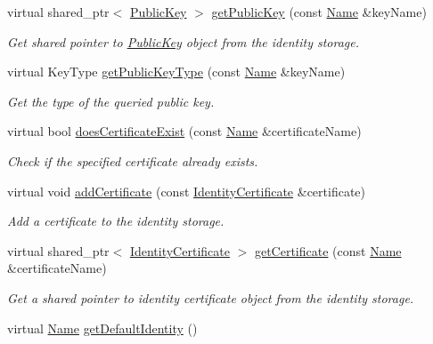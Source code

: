 \begin{DoxyCompactItemize}
virtual shared\+\_\+ptr$<$ \hyperlink{classndn_1_1PublicKey}{Public\+Key} $>$ \hyperlink{classndn_1_1security_1_1DummyPublicInfo_a78a048f1e6f2c9a71e446d6392f3caa7}{get\+Public\+Key} (const \hyperlink{classndn_1_1Name}{Name} \&key\+Name)
\begin{DoxyCompactList}\small\item\em Get shared pointer to \hyperlink{classndn_1_1PublicKey}{Public\+Key} object from the identity storage. \end{DoxyCompactList}\item 
virtual Key\+Type \hyperlink{classndn_1_1security_1_1DummyPublicInfo_a442a7677587ae4647321d05c0caba1b3}{get\+Public\+Key\+Type} (const \hyperlink{classndn_1_1Name}{Name} \&key\+Name)
\begin{DoxyCompactList}\small\item\em Get the type of the queried public key. \end{DoxyCompactList}\item 
virtual bool \hyperlink{classndn_1_1security_1_1DummyPublicInfo_a8a814b380ac6a455e1168f9f3d22f836}{does\+Certificate\+Exist} (const \hyperlink{classndn_1_1Name}{Name} \&certificate\+Name)
\begin{DoxyCompactList}\small\item\em Check if the specified certificate already exists. \end{DoxyCompactList}\item 
virtual void \hyperlink{classndn_1_1security_1_1DummyPublicInfo_a37920a411ee483dd633dc35b0a34d8f5}{add\+Certificate} (const \hyperlink{classndn_1_1IdentityCertificate}{Identity\+Certificate} \&certificate)
\begin{DoxyCompactList}\small\item\em Add a certificate to the identity storage. \end{DoxyCompactList}\item 
virtual shared\+\_\+ptr$<$ \hyperlink{classndn_1_1IdentityCertificate}{Identity\+Certificate} $>$ \hyperlink{classndn_1_1security_1_1DummyPublicInfo_a05aa352bb7023a5e9649dbeefd2dcedf}{get\+Certificate} (const \hyperlink{classndn_1_1Name}{Name} \&certificate\+Name)
\begin{DoxyCompactList}\small\item\em Get a shared pointer to identity certificate object from the identity storage. \end{DoxyCompactList}\item 
virtual \hyperlink{classndn_1_1Name}{Name} \hyperlink{classndn_1_1security_1_1DummyPublicInfo_a2a7bb21ca938994ee58318bac2331976}{get\+Default\+Identity} ()

\end{DoxyCompactItemize}
